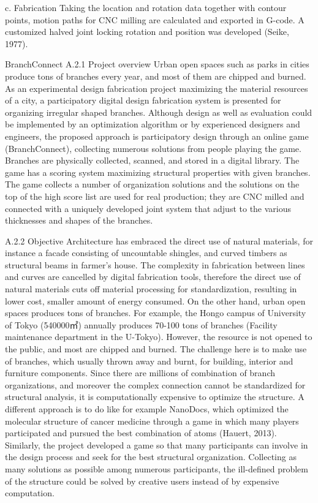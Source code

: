 c.  Fabrication
Taking the location and rotation data together with contour points, motion paths for CNC milling are calculated and exported in G-code. A customized halved joint locking rotation and position was developed (Seike, 1977). 





BranchConnect
A.2.1 Project overview
Urban open spaces such as parks in cities produce tons of branches every year, and most of them are chipped and burned. As an experimental design fabrication project maximizing the material resources of a city, a participatory digital design fabrication system is presented for organizing irregular shaped branches. Although design as well as evaluation could be implemented by an optimization algorithm or by experienced designers and engineers, the proposed approach is participatory design through an online game (BranchConnect), collecting numerous solutions from people playing the game. Branches are physically collected, scanned, and stored in a digital library. The game has a scoring system maximizing structural properties with given branches. The game collects a number of organization solutions and the solutions on the top of the high score list are used for real production; they are CNC milled and connected with a uniquely developed joint system that adjust to the various thicknesses and shapes of the branches. 

A.2.2 Objective
Architecture has embraced the direct use of natural materials, for instance a facade consisting of uncountable shingles, and curved timbers as structural beams in farmer's house. The complexity in fabrication between lines and curves are cancelled by digital fabrication tools, therefore the direct use of natural materials cuts off material processing for standardization, resulting in lower cost, smaller amount of energy consumed. On the other hand, urban open spaces produces tons of branches. For example, the Hongo campus of University of Tokyo (540000㎡) annually produces 70-100 tons of branches (Facility maintenance department in the U-Tokyo). However, the resource is not opened to the public, and most are chipped and burned. The challenge here is to make use of branches, which usually thrown away and burnt, for building, interior and furniture components.
	Since there are millions of combination of branch organizations, and moreover the complex connection cannot be standardized for structural analysis, it is computationally expensive to optimize the structure. A different approach is to do like for example NanoDocs, which optimized the molecular structure of cancer medicine through a game in which many players participated and pursued the best combination of atoms (Hauert, 2013). Similarly, the project developed a game so that many participants can involve in the design process and seek for the best structural organization. Collecting as many solutions as possible among numerous participants, the ill-defined problem of the structure could be solved by creative users instead of by expensive computation. 

